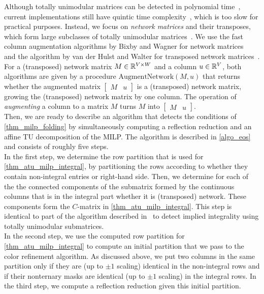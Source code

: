 \documentclass[pdflatex,sn-mathphys-num]{sn-jnl}%
\theoremstyle{thmstyleone}%
\theoremstyle{thmstylethree}%
\theoremstyle{thmstyletwo}%
\begin{document}
Although totally unimodular matrices can be detected in polynomial time~\cite{Truemper1990}, current implementations still have quintic time complexity~\cite{Walter2013}, which is too slow for practical purposes. Instead, we focus on \emph{network matrices} and their transposes, which form large subclasses of totally unimodular matrices~\cite{Schrijver86}. We use the fast column augmentation algorithms by Bixby and Wagner for network matrices~\cite{BixbyWagner1988} and the algorithm by van der Hulst and Walter for transposed network matrices~\cite{RowNetworkMatrixPaper}. For a (transposed) network matrix $M \in \mathbb{R}^{V\times W}$ and a column $u\in \mathbb{R}^V$, both algorithms are given by a procedure $\mathrm{AugmentNetwork}(M,u)$ that returns whether the augmented matrix $\begin{bmatrix}
    M & u
\end{bmatrix}$ is a (transposed) network matrix, growing the (transposed) network matrix by one column. The operation of \emph{augmenting} a column to a matrix $M$ turns $M$ into $\begin{bmatrix}
    M & u
\end{bmatrix}$.\\

Then, we are ready to describe an algorithm that detects the conditions of \cref{thm_milp_folding} by simultaneously computing a reflection reduction and an affine TU decomposition of the MILP. The algorithm is described in \cref{algo_eos} and consists of roughly five steps.\\

In the first step, we determine the row partition that is used for \cref{thm_atu_milp_integral}, by partitioning the rows according to whether they contain non-integral entries or right-hand side. Then, we determine for each of the the connected components of the submatrix formed by the continuous columns that is in the integral part whether it is (transposed) network. These components form the $C$-matrix in \cref{thm_atu_milp_integral}. This step is identical to part of the algorithm described in~\cite{VanDerHulst2025} to detect implied integrality using totally unimodular submatrices.\\

In the second step, we use the computed row partition for \cref{thm_atu_milp_integral} to compute an initial partition that we pass to the color refinement algorithm. As discussed above, we put two columns in the same partition only if they are (up to $\pm 1$ scaling) identical in the non-integral rows and if their nonternary masks are identical (up to $\pm 1$ scaling) in the integral rows. In the third step, we compute a reflection reduction given this initial partition. \\
\end{document}
